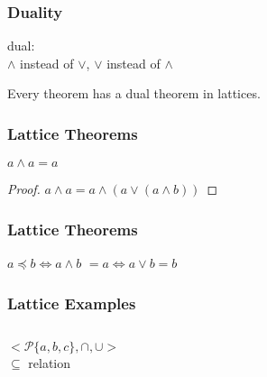 \documentclass[dvipsnames]{beamer}
\begin{document}
\begin{frame}
  \frametitle{Duality}

  \begin{definition}
    \alert{dual}:\\
    $\wedge$ instead of $\vee$, $\vee$ instead of $\wedge$
  \end{definition}

  \pause
  \begin{theorem}
    Every theorem has a dual theorem in lattices.
  \end{theorem}
\end{frame}

\begin{frame}
  \frametitle{Lattice Theorems}

  \begin{theorem}
    $a \wedge a = a$
  \end{theorem}

  \pause
  \begin{proof}
    $a \wedge a = a \wedge (a \vee (a \wedge b))$
  \end{proof}
\end{frame}

\begin{frame}
  \frametitle{Lattice Theorems}

  \begin{theorem}
    $a \preceq b \Leftrightarrow a \wedge b$
    $ = a \Leftrightarrow a \vee b = b$
  \end{theorem}
\end{frame}

\begin{frame}
  \frametitle{Lattice Examples}

  \begin{example}
    \begin{columns}
      \[
	<\mathcal{P}\{a,b,c\},\cap,\cup>
      \]
      $\subseteq$ relation

      \begin{center}
      \end{center}
    \end{columns}
  \end{example}
\end{frame}
\end{document}
